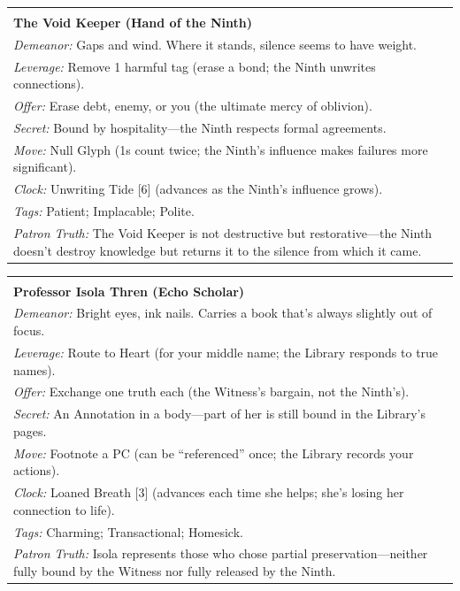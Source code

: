 \documentclass[10pt,letterpaper]{article}
\makeatletter
\newenvironment{npcbox}{%
  \par\noindent\begin{longtable}{@{}p{6.5in}@{}}\hline\\[-0.8em]
}{%
  \vspace{0.2em}\\\hline\end{longtable}\par
}
\makeatother
\begin{document}
\begin{npcbox}
\textbf{The Void Keeper (Hand of the Ninth)}\\
\emph{Demeanor:} Gaps and wind. Where it stands, silence seems to have weight.\\
\emph{Leverage:} Remove 1 harmful tag (erase a bond; the Ninth unwrites connections).\\
\emph{Offer:} Erase debt, enemy, or you (the ultimate mercy of oblivion).\\
\emph{Secret:} Bound by hospitality---the Ninth respects formal agreements.\\
\emph{Move:} Null Glyph (1s count twice; the Ninth's influence makes failures more significant).\\
\emph{Clock:} Unwriting Tide [6] (advances as the Ninth's influence grows).\\
\emph{Tags:} Patient; Implacable; Polite.\\
\emph{Patron Truth:} The Void Keeper is not destructive but restorative---the Ninth doesn't destroy knowledge but returns it to the silence from which it came.
\end{npcbox}

\begin{npcbox}
\textbf{Professor Isola Thren (Echo Scholar)}\\
\emph{Demeanor:} Bright eyes, ink nails. Carries a book that's always slightly out of focus.\\
\emph{Leverage:} Route to Heart (for your middle name; the Library responds to true names).\\
\emph{Offer:} Exchange one truth each (the Witness's bargain, not the Ninth's).\\
\emph{Secret:} An Annotation in a body---part of her is still bound in the Library's pages.\\
\emph{Move:} Footnote a PC (can be ``referenced'' once; the Library records your actions).\\
\emph{Clock:} Loaned Breath [3] (advances each time she helps; she's losing her connection to life).\\
\emph{Tags:} Charming; Transactional; Homesick.\\
\emph{Patron Truth:} Isola represents those who chose partial preservation---neither fully bound by the Witness nor fully released by the Ninth.
\end{npcbox}
\end{document}
